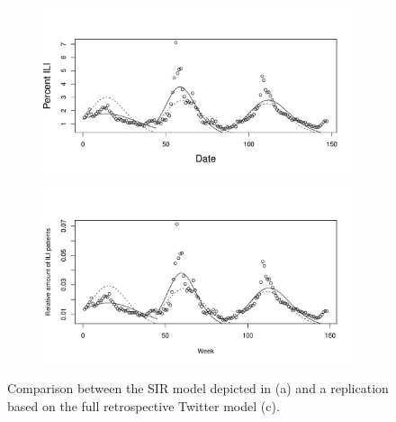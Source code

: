 \documentclass[11pt, a4paper,twoside]{report}\usepackage[]{graphicx}\usepackage[]{color}
\begin{document}
\begin{figure}[htbp!]
\centering
  \begin{subfigure}[t]{1\textwidth}
  \includegraphics[width=1\linewidth]{02_todd_bodnar_SIR.pdf}
  \caption{}
  \label{fig:SIR_comparison_original}
  \end{subfigure}

  \begin{subfigure}[t]{1\textwidth}
  \includegraphics[width=1\linewidth]{39_SIR_model_full_model_25.pdf}
  \caption{}
  \label{fig:SIR_comparison_full}
  \end{subfigure}
  \caption{Comparison between the SIR model depicted in \citep{bodnar_data_2015} (a) and a replication based on the full retrospective Twitter model (c).}
    \label{fig:SIR_comparison_CDC_full_model}
\end{figure}
\end{document}
